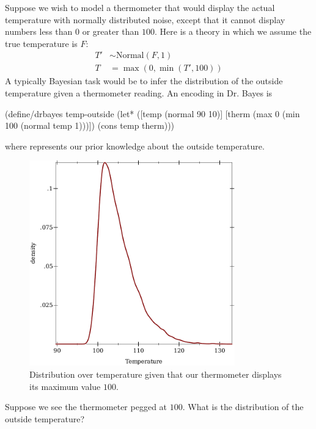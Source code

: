 Suppose we wish to model a thermometer that would display the actual temperature with normally distributed noise, except that it cannot display numbers less than $0$ or greater than $100$.
Here is a theory in which we assume the true temperature is $\mathit{F}$:
%
\begin{equation}
\begin{aligned}
	T' &\sim \mathrm{Normal}(F,1) \\
	T &= \max(0,\min(T',100))
\end{aligned}
\end{equation}
%
A typically Bayesian task would be to infer the distribution of the outside temperature given a thermometer reading.
An encoding in Dr. Bayes is
\begin{center}\singlespacing
\begin{schemedisplay}
(define/drbayes temp-outside
  (let* ([temp   (normal 90 10)]
         [therm  (max 0 (min 100 (normal temp 1)))])
    (cons temp therm)))
\end{schemedisplay}
\end{center}
where  represents our prior knowledge about the outside temperature.

\begin{figure}[tb!]\centering%
\includegraphics[width=3.5in]{results/thermometer-density}%
\caption[Bayesian inference with a bounded measuring device]{Distribution over temperature given that our thermometer displays its maximum value $100$.}%
\label{fig:thermometer-results}
\end{figure}

Suppose we see the thermometer pegged at $100$.
What is the distribution of the outside temperature?

